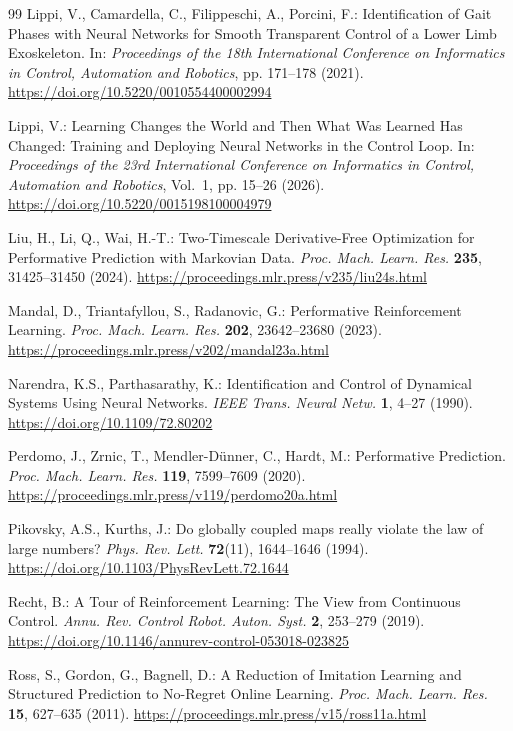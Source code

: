 \documentclass[11pt]{article}
\theoremstyle{definition}
\theoremstyle{remark}
\begin{document}
{\begin{thebibliography}{99}
Lippi, V., Camardella, C., Filippeschi, A., Porcini, F.: Identification of Gait Phases with Neural Networks for Smooth Transparent Control of a Lower Limb Exoskeleton. In: \emph{Proceedings of the 18th International Conference on Informatics in Control, Automation and Robotics}, pp. 171--178 (2021). \url{https://doi.org/10.5220/0010554400002994}

Lippi, V.: Learning Changes the World and Then What Was Learned Has Changed: Training and Deploying Neural Networks in the Control Loop. In: \emph{Proceedings of the 23rd International Conference on Informatics in Control, Automation and Robotics}, Vol.~1, pp. 15--26 (2026). \url{https://doi.org/10.5220/0015198100004979}

Liu, H., Li, Q., Wai, H.-T.: Two-Timescale Derivative-Free Optimization for Performative Prediction with Markovian Data. \emph{Proc. Mach. Learn. Res.} \textbf{235}, 31425--31450 (2024). \url{https://proceedings.mlr.press/v235/liu24s.html}

Mandal, D., Triantafyllou, S., Radanovic, G.: Performative Reinforcement Learning. \emph{Proc. Mach. Learn. Res.} \textbf{202}, 23642--23680 (2023). \url{https://proceedings.mlr.press/v202/mandal23a.html}

Narendra, K.S., Parthasarathy, K.: Identification and Control of Dynamical Systems Using Neural Networks. \emph{IEEE Trans. Neural Netw.} \textbf{1}, 4--27 (1990). \url{https://doi.org/10.1109/72.80202}

Perdomo, J., Zrnic, T., Mendler-D\"unner, C., Hardt, M.: Performative Prediction. \emph{Proc. Mach. Learn. Res.} \textbf{119}, 7599--7609 (2020). \url{https://proceedings.mlr.press/v119/perdomo20a.html}

Pikovsky, A.S., Kurths, J.: Do globally coupled maps really violate the law of large numbers? \emph{Phys. Rev. Lett.} \textbf{72}(11), 1644--1646 (1994). \url{https://doi.org/10.1103/PhysRevLett.72.1644}

Recht, B.: A Tour of Reinforcement Learning: The View from Continuous Control. \emph{Annu. Rev. Control Robot. Auton. Syst.} \textbf{2}, 253--279 (2019). \url{https://doi.org/10.1146/annurev-control-053018-023825}

Ross, S., Gordon, G., Bagnell, D.: A Reduction of Imitation Learning and Structured Prediction to No-Regret Online Learning. \emph{Proc. Mach. Learn. Res.} \textbf{15}, 627--635 (2011). \url{https://proceedings.mlr.press/v15/ross11a.html}


\end{thebibliography}}
\end{document}
